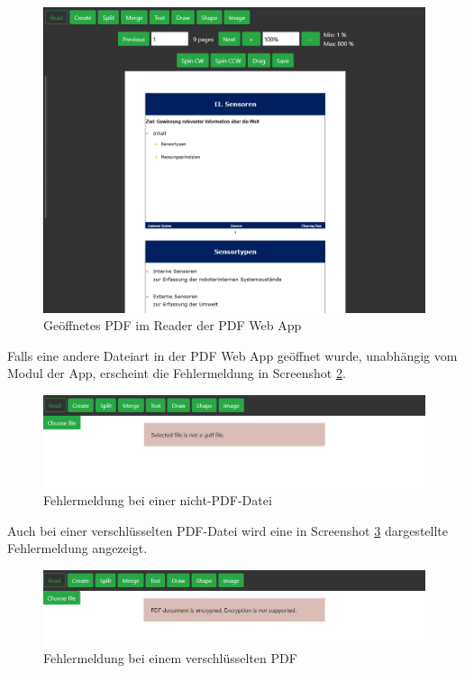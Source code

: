 \begin{figure}[!htbp]
	\centering
	\includegraphics[width=1\textwidth]{"images/reader.png"}
	\caption{Geöffnetes PDF im Reader der PDF Web App}
	\label{fig:reader}
\end{figure}

Falls eine andere Dateiart in der PDF Web App geöffnet wurde, unabhängig vom Modul der App, erscheint die Fehlermeldung in Screenshot \ref{fig:errorfile}. 

\begin{figure}[!htbp]
	\centering
	\includegraphics[width=1\textwidth]{"images/errorfile.png"}
	\caption{Fehlermeldung bei einer nicht-PDF-Datei}
	\label{fig:errorfile}
\end{figure}

Auch bei einer verschlüsselten PDF-Datei wird eine in Screenshot \ref{fig:errorcrypt} dargestellte Fehlermeldung angezeigt.

\begin{figure}[!htbp]
	\centering
	\includegraphics[width=1\textwidth]{"images/errorcrypt.png"}
	\caption{Fehlermeldung bei einem verschlüsselten PDF}
	\label{fig:errorcrypt}
\end{figure}

